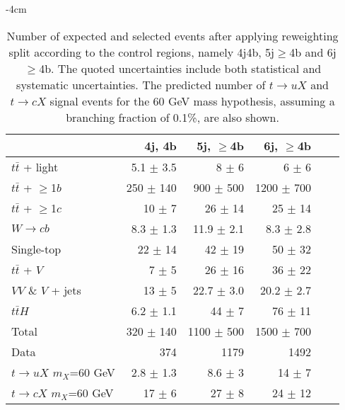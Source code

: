 \begin{table}[htb]
    \small
    \addtolength{\leftskip} {-4cm} %
    \addtolength{\rightskip}{-4cm}
    \centering
    \begin{tabular}{l r r r r r}
        \toprule\toprule
        & {4j, 4b} & {5j, $\ge$4b} & {6j, $\ge$4b} \\
        \midrule 
        $t\bar{t}$ + light        &  5.1 $\pm$ 3.5 & 8   $\pm$ 6   & 6    $\pm$ 6   \\ 
        $t\bar{t}$ + $\geq$1$b$   &  250 $\pm$ 140 & 900 $\pm$ 500 & 1200 $\pm$ 700 \\ 
        $t\bar{t}$ + $\geq$1$c$   &  10  $\pm$ 7   & 26  $\pm$ 14  & 25   $\pm$ 14  \\ 
        $W\rightarrow cb$         & 8.3 $\pm$ 1.3 & 11.9 $\pm$ 2.1   & 8.3 $\pm$ 2.8     \\ 
        Single-top                & 22  $\pm$ 14  & 42   $\pm$ 19    & 50 $\pm$ 32 \\ 
        $t\bar{t}$ + $V$          & 7 $\pm$ 5  & 26 $\pm$ 16  & 36 $\pm$ 22     \\ 
        $VV$ \& $V$ + jets        &  13 $\pm$ 5  & 22.7 $\pm$ 3.0  & 20.2 $\pm$ 2.7    \\ 
        $t\bar{t}H$               & 6.2 $\pm$ 1.1 &  44 $\pm$ 7  & 76 $\pm$ 11   \\                   
\midrule      
Total                     & 320 $\pm$ 140  & 1100 $\pm$ 500  & 1500 $\pm$ 700  \\
\midrule
Data                      & 374               & 1179          & 1492          \\
\midrule  
$t\to uX$ $m_X$=60 GeV             &  2.8 $\pm$ 1.3      & 8.6 $\pm$ 3    &  14 $\pm$ 7     \\
$t\to cX$ $m_X$=60 GeV             &  17  $\pm$ 6        & 27  $\pm$ 8    & 24 $\pm$ 12     \\
\bottomrule\bottomrule                               
    \end{tabular}
    \caption{
Number of expected and selected events after applying reweighting split according to the control regions,
namely 4j4b, 5j$\geq$4b and 6j$\geq$4b. The quoted uncertainties include both statistical and systematic uncertainties. The predicted number of $t\to uX$ and $t\to cX$ signal events for the 60 GeV mass hypothesis, assuming a branching
fraction of 0.1\%, are also shown.
    }
    \label{tqX:prefityields4b}
\end{table}

